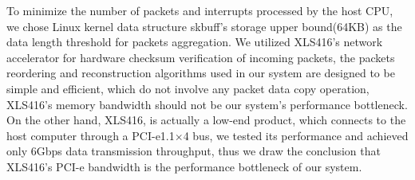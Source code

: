 \documentclass[conference]{IEEEtran}
\begin{document}
To minimize the number of packets and interrupts processed by the host CPU, we chose Linux kernel data structure skbuff's storage upper bound(64KB) as the data length threshold for packets aggregation. We utilized XLS416's network accelerator for hardware checksum verification of incoming packets, the packets reordering and reconstruction algorithms used in our system are designed to be simple and efficient, which do not involve any packet data copy operation, XLS416's memory bandwidth should not be our system's performance bottleneck. On the other hand, XLS416, is actually a low-end product, which connects to the host computer through a PCI-e1.1$\times$4 bus, we tested its performance and achieved only 6Gbps data transmission throughput, thus we draw the conclusion that XLS416's PCI-e bandwidth is the performance bottleneck of our system.
%
%

\end{document}
